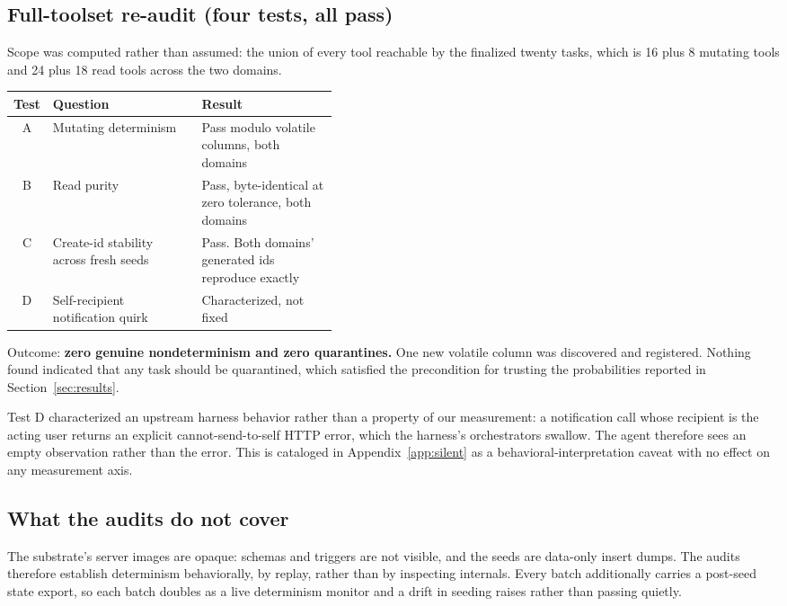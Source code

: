 \subsection{Full-toolset re-audit (four tests, all pass)}

Scope was computed rather than assumed: the union of every tool reachable by the
finalized twenty tasks, which is 16 plus 8 mutating tools and 24 plus 18 read
tools across the two domains.

\begin{table}[h]
\centering
\small
\begin{tabular}{@{}clp{0.42\linewidth}@{}}
\toprule
Test & Question & Result \\
\midrule
A & Mutating determinism & Pass modulo volatile columns, both domains \\
B & Read purity & Pass, byte-identical at zero tolerance, both domains \\
C & Create-id stability across fresh seeds & Pass. Both domains' generated ids
reproduce exactly \\
D & Self-recipient notification quirk & Characterized, not fixed \\
\bottomrule
\end{tabular}
\end{table}

Outcome: \textbf{zero genuine nondeterminism and zero quarantines.} One new
volatile column was discovered and registered. Nothing found indicated that any
task should be quarantined, which satisfied the precondition for trusting the
probabilities reported in Section~\ref{sec:results}.

Test D characterized an upstream harness behavior rather than a property of our
measurement: a notification call whose recipient is the acting user returns an
explicit cannot-send-to-self HTTP error, which the harness's orchestrators
swallow. The agent therefore sees an empty observation rather than the error.
This is cataloged in Appendix~\ref{app:silent} as a behavioral-interpretation
caveat with no effect on any measurement axis.

\subsection{What the audits do not cover}

The substrate's server images are opaque: schemas and triggers are not visible,
and the seeds are data-only insert dumps. The audits therefore establish
determinism behaviorally, by replay, rather than by inspecting internals. Every
batch additionally carries a post-seed state export, so each batch doubles as a
live determinism monitor and a drift in seeding raises rather than passing
quietly.

